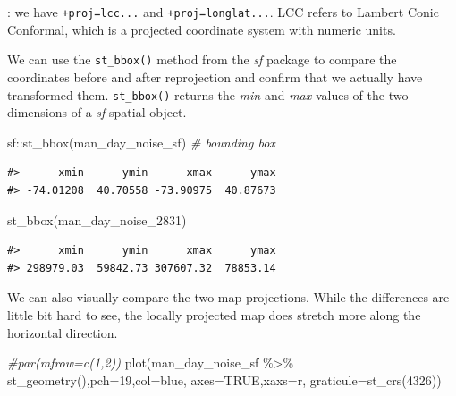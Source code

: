 \documentclass[
  11pt,
]{book}
\newenvironment{Shaded}{\begin{snugshade}}{\end{snugshade}}
\newcommand{\AttributeTok}[1]{\textcolor[rgb]{0.77,0.63,0.00}{#1}}
\newcommand{\CommentTok}[1]{\textcolor[rgb]{0.56,0.35,0.01}{\textit{#1}}}
\newcommand{\ConstantTok}[1]{\textcolor[rgb]{0.00,0.00,0.00}{#1}}
\newcommand{\DecValTok}[1]{\textcolor[rgb]{0.00,0.00,0.81}{#1}}
\newcommand{\FunctionTok}[1]{\textcolor[rgb]{0.00,0.00,0.00}{#1}}
\newcommand{\NormalTok}[1]{#1}
\newcommand{\SpecialCharTok}[1]{\textcolor[rgb]{0.00,0.00,0.00}{#1}}
\newcommand{\StringTok}[1]{\textcolor[rgb]{0.31,0.60,0.02}{#1}}
\begin{document}
: we have \texttt{+proj=lcc...} and \texttt{+proj=longlat...}. LCC refers to Lambert Conic Conformal, which is a projected coordinate system with numeric units.

We can use the \texttt{st\_bbox()} method from the \emph{sf} package to compare the coordinates before and after reprojection and confirm that we actually have transformed them. \texttt{st\_bbox()} returns the \emph{min} and \emph{max} values of the two dimensions of a \emph{sf} spatial object.

\begin{Shaded}
\begin{Highlighting}[]
\NormalTok{sf}\SpecialCharTok{::}\FunctionTok{st\_bbox}\NormalTok{(man\_day\_noise\_sf) }\CommentTok{\# bounding box}
\end{Highlighting}
\end{Shaded}

\begin{verbatim}
#>      xmin      ymin      xmax      ymax 
#> -74.01208  40.70558 -73.90975  40.87673
\end{verbatim}

\begin{Shaded}
\begin{Highlighting}[]
\FunctionTok{st\_bbox}\NormalTok{(man\_day\_noise\_2831)}
\end{Highlighting}
\end{Shaded}

\begin{verbatim}
#>      xmin      ymin      xmax      ymax 
#> 298979.03  59842.73 307607.32  78853.14
\end{verbatim}

We can also visually compare the two map projections. While the differences are little bit hard to see, the locally projected map does stretch more along the horizontal direction.

\begin{Shaded}
\begin{Highlighting}[]
\CommentTok{\#par(mfrow=c(1,2))}
\FunctionTok{plot}\NormalTok{(man\_day\_noise\_sf }\SpecialCharTok{\%\textgreater{}\%} \FunctionTok{st\_geometry}\NormalTok{(),}\AttributeTok{pch=}\DecValTok{19}\NormalTok{,}\AttributeTok{col=}\StringTok{\textquotesingle{}blue\textquotesingle{}}\NormalTok{, }\AttributeTok{axes=}\ConstantTok{TRUE}\NormalTok{,}\AttributeTok{xaxs=}\StringTok{\textquotesingle{}r\textquotesingle{}}\NormalTok{, }\AttributeTok{graticule=}\FunctionTok{st\_crs}\NormalTok{(}\DecValTok{4326}\NormalTok{))}
\end{Highlighting}
\end{Shaded}
\end{document}
